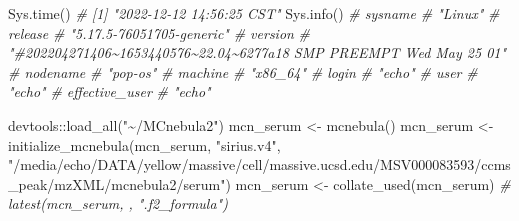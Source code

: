 \documentclass[
]{article}
\newenvironment{Shaded}{\begin{snugshade}}{\end{snugshade}}
\newcommand{\CommentTok}[1]{\textcolor[rgb]{0.56,0.35,0.01}{\textit{#1}}}
\newcommand{\FunctionTok}[1]{\textcolor[rgb]{0.00,0.00,0.00}{#1}}
\newcommand{\NormalTok}[1]{#1}
\newcommand{\OtherTok}[1]{\textcolor[rgb]{0.56,0.35,0.01}{#1}}
\newcommand{\SpecialCharTok}[1]{\textcolor[rgb]{0.00,0.00,0.00}{#1}}
\newcommand{\StringTok}[1]{\textcolor[rgb]{0.31,0.60,0.02}{#1}}
\begin{document}
\begin{Shaded}
\begin{Highlighting}[]
\FunctionTok{Sys.time}\NormalTok{()}
\CommentTok{\# [1] "2022{-}12{-}12 14:56:25 CST"}
\FunctionTok{Sys.info}\NormalTok{()}
\CommentTok{\#                                                            sysname }
\CommentTok{\#                                                            "Linux" }
\CommentTok{\#                                                            release }
\CommentTok{\#                                          "5.17.5{-}76051705{-}generic" }
\CommentTok{\#                                                            version }
\CommentTok{\# "\#202204271406\textasciitilde{}1653440576\textasciitilde{}22.04\textasciitilde{}6277a18 SMP PREEMPT Wed May 25 01" }
\CommentTok{\#                                                           nodename }
\CommentTok{\#                                                           "pop{-}os" }
\CommentTok{\#                                                            machine }
\CommentTok{\#                                                           "x86\_64" }
\CommentTok{\#                                                              login }
\CommentTok{\#                                                             "echo" }
\CommentTok{\#                                                               user }
\CommentTok{\#                                                             "echo" }
\CommentTok{\#                                                     effective\_user }
\CommentTok{\#                                                             "echo" }

\NormalTok{devtools}\SpecialCharTok{::}\FunctionTok{load\_all}\NormalTok{(}\StringTok{"\textasciitilde{}/MCnebula2"}\NormalTok{)}
\NormalTok{mcn\_serum }\OtherTok{\textless{}{-}} \FunctionTok{mcnebula}\NormalTok{()}
\NormalTok{mcn\_serum }\OtherTok{\textless{}{-}} \FunctionTok{initialize\_mcnebula}\NormalTok{(mcn\_serum, }\StringTok{"sirius.v4"}\NormalTok{, }\StringTok{"/media/echo/DATA/yellow/massive/cell/massive.ucsd.edu/MSV000083593/ccms\_peak/mzXML/mcnebula2/serum"}\NormalTok{)}
\NormalTok{mcn\_serum }\OtherTok{\textless{}{-}} \FunctionTok{collate\_used}\NormalTok{(mcn\_serum)}
\CommentTok{\# latest(mcn\_serum, , ".f2\_formula")}


\end{Highlighting}
\end{Shaded}
\end{document}
